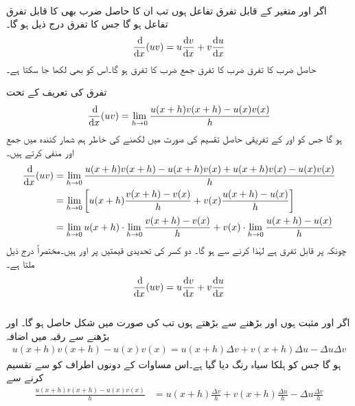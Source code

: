 \\
اگر  اور  متغیر  کے قابل تفرق تفاعل ہوں تب ان کا حاصل ضرب  بھی  کا قابل تفرق تفاعل ہو گا جس کا تفرق درج ذیل ہو گا۔
\begin{align*}
\frac{\dif}{\dif x}(uv)=u\frac{\dif v}{\dif x}+v\frac{\dif u}{\dif x}
\end{align*}
حاصل ضرب  کا تفرق  ضرب  کا تفرق جمع  ضرب  کا تفرق ہو گا۔اس کو  بھی لکھا جا سکتا ہے۔

تفرق کی تعریف کے تحت
\begin{align*}
\frac{\dif}{\dif x}(uv)=\lim_{h\to 0}\frac{u(x+h)v(x+h)-u(x)v(x)}{h}
\end{align*}
ہو گا جس کو  اور  کے تفریقی حاصل تقسیم کی صورت میں لکھنے کی خاطر ہم شمار کنندہ میں  جمع اور منفی کرتے ہیں۔
\begin{align*}
\frac{\dif}{\dif x}(uv)&=\lim_{h\to 0}\frac{u(x+h)v(x+h)-u(x+h)v(x)+u(x+h)v(x)-u(x)v(x)}{h}\\
&=\lim_{h\to 0}\left[u(x+h)\frac{v(x+h)-v(x)}{h}+v(x)\frac{u(x+h)-u(x)}{h} \right]\\
&=\lim_{h\to 0} u(x+h)\cdot \lim_{h\to 0}\frac{v(x+h)-v(x)}{h}+v(x)\cdot\lim_{h\to 0}\frac{u(x+h)-u(x)}{h}
\end{align*}
چونکہ  پر  قابل تفرق ہے لہٰذا  کرنے سے  ہو گا۔ دو کسر کی تحدیدی قیمتیں  پر   اور  ہیں۔مختصراً درج ذیل ملتا ہے۔
\begin{align*}
\frac{\dif}{\dif x}(uv)=u\frac{\dif v}{\dif x}+v\frac{\dif u}{\dif x}
\end{align*}
\\
اگر  اور  مثبت ہوں اور  بڑھنے سے بڑھتے ہوں تب   کی صورت میں شکل  حاصل ہو گا۔ اور  بڑھنے سے رقبہ میں اضافہ
\begin{align*}
u(x+h)v(x+h)-u(x)v(x)=u(x+h)\Delta v+v(x+h)\Delta u-\Delta u\Delta v
\end{align*}
ہو گا جس کو ہلکا سیاہ رنگ دیا گیا ہے۔اس مساوات کے دونوں اطراف کو  سے تقسیم  کرنے سے
\begin{align*}
\frac{u(x+h)v(x+h)-u(x)v(x)}{h}&=u(x+h)\frac{\Delta v}{h}+v(x+h)\frac{\Delta u}{h}-\Delta u\frac{\Delta v}{h}
\end{align*}
